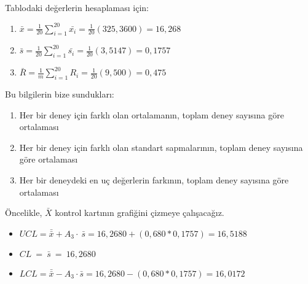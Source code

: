 Tablodaki değerlerin hesaplaması için: 

\begin{enumerate}[label=\Roman{enumi}.]
	

\item
$\bar{x} = \frac{1}{20}\sum_{i=1}^{20}\bar{x_i} = \frac{1}{20}(325,3600) = 16,268$
\item
$\bar{s}=\frac{1}{20}\sum _{i=1}^{20}\bar{s_i}=\frac{1}{20}\left(3,5147\right)=0,1757$
\item
$\bar{R}=\frac{1}{m}\sum _{i=1}^{20}R_i=\frac{1}{20}\left(9,500\right)=0,475$

\end{enumerate}

\cleardoublepage

Bu bilgilerin bize sundukları: 

\begin{enumerate}[label=\Roman{enumi}.]
	\item
	Her bir deney için farklı olan ortalamanın, toplam deney sayısına göre ortalaması 
	\item
	Her bir deney için farklı olan standart sapmalarının, toplam deney sayısına göre ortalaması 
	\item
	Her bir deneydeki en uç değerlerin farkının, toplam deney sayısına göre ortalaması 
\end{enumerate}

Öncelikle, $\bar{X}$ kontrol kartının grafiğini çizmeye çalışacağız. 

\begin{itemize}
	\item
	\centering
	$UCL=\bar{\bar{x}}+A_3\cdot \ \bar{s}=16,2680+\left(0,680\ast 0,1757\right)=16,5188$
	\item
	$CL\ =\ \bar{s}\ =\ 16,2680$
	\item
	$LCL=\bar{\bar{x}}-A_3\cdot \bar{s}=16,2680-\left(0,680\ast 0,1757\right)=16,0172$
\end{itemize}


